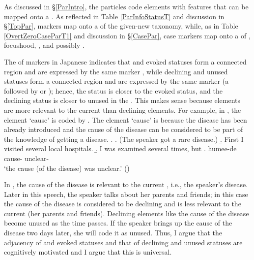 As discussed in \S \ref{ParIntro},
the particles code elements with features that can be mapped onto a .
As reflected in Table \ref{ParInfoStatusT} and discussion in \S \ref{TopPar},
 markers map onto a  of the given-new taxonomy,
while, as in Table \ref{OvertZeroCaseParT1} and discussion in \S \ref{CasePar},
case markers map onto a  of , focushood, , and possibly .

The  of  markers in Japanese indicates that
 and evoked statuses form a connected region and are expressed by the same marker ,
while declining and unused statuses form a connected region and are expressed by the same marker (a  followed by  or );
hence, the  status is closer to the evoked status, and the declining status is closer to unused in the .
This makes sense because  elements are more relevant to
the current  than declining elements.
For example, in \Next,
the  element  `cause' is coded by .
The element `cause' is  because the disease has been already introduced and the cause of the disease can be considered to be part of the knowledge of getting a disease.
%
\ex.
 \a. (The speaker got a rare disease.)
 \b. First I visited several local hospitals.
 \b. I was examined several times, but
 \bg.  humee-de \\
   cause- unclear- \\
   `the cause (of the disease) was unclear.'
   \hfill{()}
%

In \Last,
the cause of the disease is relevant to the current , i.e., the speaker's disease.
Later in this speech,
the speaker talks about her parents and friends;
in this case the cause of the disease is considered to be declining and is less relevant to the current  (her parents and friends).
Declining elements like the cause of the disease become unused as the time passes.
If the speaker brings up the cause of the disease two days later,
she will code it as unused.
Thus, I argue that the adjacency of  and evoked statuses and that of declining and unused statuses are cognitively motivated and I argue that this is universal.

